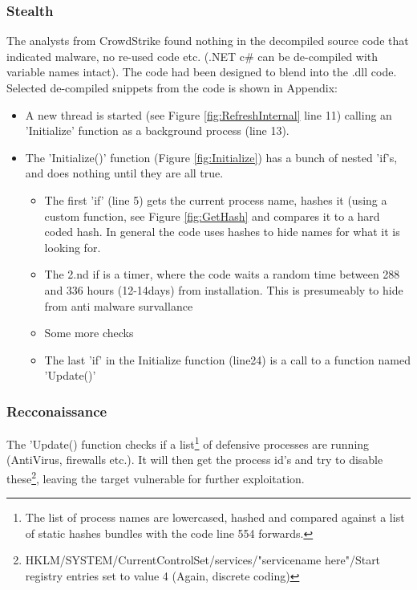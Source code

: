 \documentclass[
	letterpaper, %
	10pt, %
	unnumberedsections, %
	twoside, %
]{LTJournalArticle}
\begin{document}
\subsubsection{Stealth}
The analysts from CrowdStrike found nothing in the decompiled source code that indicated malware, no re-used code etc. (.NET c\# can be de-compiled with variable names intact). The code had been designed to blend into the .dll code. Selected de-compiled snippets from the code is shown in Appendix:

\begin{itemize}
\item{A new thread is started (see Figure \ref{fig:RefreshInternal} line 11) calling an 'Initialize' function as a background process (line 13).} 
\item
	The 'Initialize()' function (Figure \ref{fig:Initialize}) has a bunch of nested 'if's, and does nothing until they are all true. 
	\begin{itemize}
		\item The first 'if' (line 5) gets the current process name, hashes it (using a custom function, see Figure \ref{fig:GetHash} and compares it to a hard coded hash. In general the code uses hashes to hide names for what it is looking for.
		\item{The 2.nd if is a timer, where the code waits a random time between 288 and 336 hours (12-14days) from installation. This is presumeably to hide from anti malware survallance}
		\item Some more checks
		\item  The last 'if' in the Initialize function (line24) is a call to a function named 'Update()'
\end{itemize}

\end{itemize}



\subsubsection{Recconaissance}

The 'Update() function checks if a list\footnote{The list of process names are lowercased, hashed and compared against a list of static hashes bundles with the code\cite{SolarWindsOrionCoreBusinessLayerdll} line 554 forwards.} of defensive processes are running (AntiVirus, firewalls etc.). It will then get the process id's and try to disable these\footnote{HKLM/SYSTEM/CurrentControlSet/services/"servicename here"/Start registry entries set to value 4 (Again, discrete coding)}, leaving the target vulnerable for further exploitation. 
\end{document}
